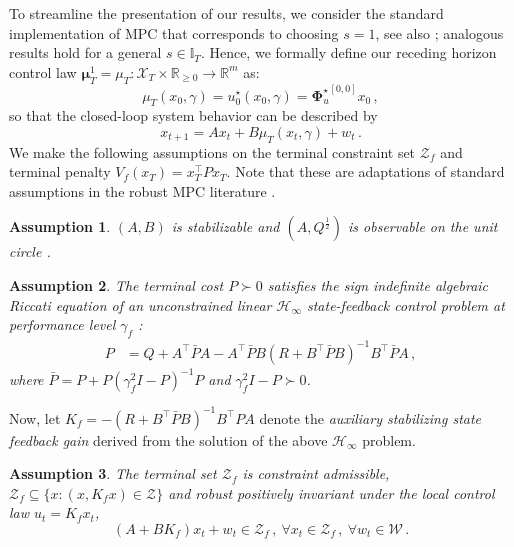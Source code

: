 \documentclass[conference]{IEEEtran}
\newtheorem{assumption}{Assumption}
\begin{document}
To streamline the presentation of our results, we consider the standard implementation of MPC that corresponds to choosing $s = 1$, see also \cite{rawlings2017model, mayne2000constrained}; analogous results hold for a general $s \in \mathbb{I}_T$. Hence, we formally define our receding horizon control law $\bm{\mu}_T^1 = \mu_T : \mathcal{X}_T \times \mathbb{R}_{\geq 0} \to \mathbb{R}^m$ as:
\begin{equation}
    \label{eq:receding_horizon_control_law}
    \mu_T(x_0, \gamma) = u_0^\star(x_0, \gamma) = {\bm{\Phi}_u^{\star}}^{[0,0]} x_0\,,
\end{equation}
so that the closed-loop system behavior can be described by
\begin{equation}
    \label{eq:closed_loop_system_receding_horizon_law}
    x_{t+1} = A x_t + B \mu_T(x_t, \gamma) + w_t\,.
\end{equation}
We make the following assumptions on the terminal constraint set $\mathcal{Z}_f$ and terminal penalty $V_f(x_T) = x_T^\top P x_T$. Note that these are adaptations of standard assumptions in the robust MPC literature \cite{rawlings2017model, mayne2000constrained}.
\begin{assumption}
    \label{ass:stab_unit_circle_obs}
    $(A, B)$ is stabilizable and $(A, Q^{\frac{1}{2}})$ is observable on the unit circle \cite{hassibi1999indefinite}.
\end{assumption}
\begin{assumption}
    \label{ass:terminal_cost}
    The terminal cost $P \succ 0$ satisfies the sign indefinite algebraic Riccati equation of an unconstrained linear $\mathcal{H}_\infty$ state-feedback control problem at performance level $\gamma_f$ \cite{hassibi1999indefinite}:
\begin{align}
    \label{eq:sign_indefinite_dare}
    P &= Q + A^\top \bar{P} A - A^\top \bar{P} B (R + B^\top \bar{P} B)^{-1} B^\top \bar{P} A\,,
\end{align}
where $\bar{P} = P + P (\gamma_f^2 I - P)^{-1} P$ and $\gamma_f^2 I - P \succ 0$.
\end{assumption}
Now, let $K_f = -(R + B^\top \bar{P} B)^{-1} B^\top P A$ denote the \textit{auxiliary stabilizing state feedback gain} derived from the solution of the above $\mathcal{H}_\infty$ problem. %
\begin{assumption}
    \label{ass:terminal_set}
    The terminal set $\mathcal{Z}_f$ is constraint admissible, $\mathcal{Z}_f \subseteq \{x : (x, K_f x) \in \mathcal{Z}\}$ and robust positively invariant under the local control law $u_t = K_f x_t$,
    \begin{equation*}
        (A + BK_f)x_t + w_t \in \mathcal{Z}_f\,, ~\forall x_t \in \mathcal{Z}_f\,, ~\forall w_t \in \mathcal{W}\,.
    \end{equation*}
\end{assumption}
\end{document}
